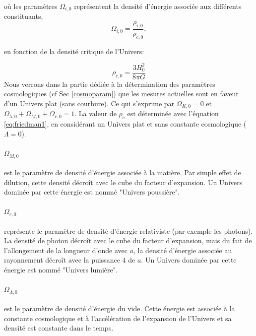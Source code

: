 où les paramètres $\Omega_{i,0}$ représentent la densité d'énergie associée aux différents constituants, 
\begin{equation}
 \Omega_{i,0} = \frac{\rho_{i,0}}{\rho_{c,0}},
 \end{equation}

en fonction de la densité critique de l'Univers:

\begin{equation}
\rho_{c,0} = \frac{3H_0^2}{8\pi G}
 \end{equation}
Nous verrons dans la partie dédiée à la détermination des paramètres cosmologiques (cf Sec \ref{cosmoparam}) que les mesures actuelles sont en faveur d'un Univers plat (sans courbure).
Ce qui s'exprime par $\Omega_{K,0} = 0$ et $\Omega_{\lambda,0} +  \Omega_{M,0} + \Omega_{r,0} =1$.
La valeur de $\rho_c$ est déterminée avec l'équation \ref{eq:friedman1}, en considérant un Univers plat et sans constante cosmologique ($\Lambda=0$).

\paragraph{$\Omega_{M,0}$} est le paramètre de densité d'énergie associée à la matière. %
Par simple effet de dilution, cette densité décroît avec le cube du facteur d'expansion.
Un Univers dominée par cette énergie est nommé "Univers poussière".

\paragraph{$\Omega_{r,0}$} représente le paramètre de densité d'énergie relativiste (par exemple les photons).
La densité de photon décroît avec le cube du facteur d'expansion, mais du fait de l'allongement de la longueur d'onde avec $a$, la densité d'énergie associée au rayonnement décroît avec la puissance $4$ de $a$.
Un Univers dominée par cette énergie est nommé "Univers lumière".

\paragraph{$\Omega_{\Lambda,0}$} est le paramètre de densité d’énergie du vide.
Cette énergie est associée à la constante cosmologique et à l'accélération de l'expansion de l'Univers et sa densité est constante dans le temps.

